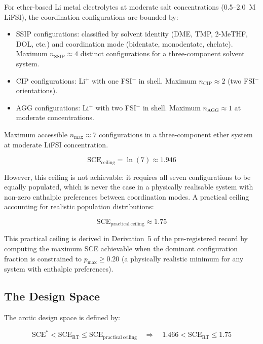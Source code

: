 \documentclass[11pt]{article}
\theoremstyle{plain}
\theoremstyle{definition}
\theoremstyle{remark}
\begin{document}
For ether-based Li metal electrolytes at moderate salt concentrations
(0.5--2.0~M LiFSI), the coordination configurations are bounded by:
\begin{itemize}[leftmargin=2em]
  \item SSIP configurations: classified by solvent identity (DME,
        TMP, 2-MeTHF, DOL, etc.) and coordination mode (bidentate,
        monodentate, chelate).  Maximum $n_\mathrm{SSIP} \approx 4$
        distinct configurations for a three-component solvent system.
  \item CIP configurations: Li$^+$ with one FSI$^-$ in shell.
        Maximum $n_\mathrm{CIP} \approx 2$ (two FSI$^-$ orientations).
  \item AGG configurations: Li$^+$ with two FSI$^-$ in shell.
        Maximum $n_\mathrm{AGG} \approx 1$ at moderate
        concentrations.
\end{itemize}

Maximum accessible $n_{\max} \approx 7$ configurations in a
three-component ether system at moderate LiFSI concentration.

\begin{equation}
  \mathrm{SCE}_{\mathrm{ceiling}} = \ln(7) \approx 1.946
  \label{eq:SCE_ceiling}
\end{equation}

However, this ceiling is not achievable: it requires all seven
configurations to be equally populated, which is never the case
in a physically realisable system with non-zero enthalpic
preferences between coordination modes.  A practical ceiling
accounting for realistic population distributions:

\begin{equation}
  \mathrm{SCE}_{\mathrm{practical~ceiling}} \approx 1.75
  \label{eq:SCE_practical_ceiling}
\end{equation}

This practical ceiling is derived in Derivation~5 of the
pre-registered record by computing the maximum SCE achievable when
the dominant configuration fraction is constrained to
$p_{\max} \geq 0.20$ (a physically realistic minimum for any
system with enthalpic preferences).

\subsection{The Design Space}

The arctic design space is defined by:

\begin{equation}
  \mathrm{SCE}^{*} < \mathrm{SCE}_\mathrm{RT} \leq
  \mathrm{SCE}_\mathrm{practical~ceiling}
  \quad \Rightarrow \quad
  1.466 < \mathrm{SCE}_\mathrm{RT} \leq 1.75
  \label{eq:arctic_design_space}
\end{equation}
\end{document}
